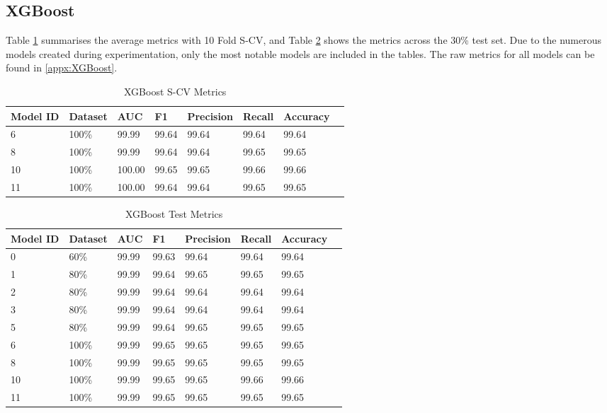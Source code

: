 \subsection{XGBoost}

 Table \ref{tab:xgb-scv-metrics} summarises the average metrics with 10 Fold S-CV, and Table \ref{tab:xgb-test-metrics} shows the metrics across the 30\% test set. Due to the numerous models created during experimentation, only the most notable models are included in the tables. The raw metrics for all models can be found in \ref{appx:XGBoost}. 

\begin{table}[h]
\centering
\caption{XGBoost S-CV Metrics}
\label{tab:xgb-scv-metrics}
\begin{tabular}{|l|l|l|l|l|l|l|l|}
\hline
\textbf{Model ID} & \textbf{Dataset} & \textbf{AUC} & \textbf{F1} & \textbf{Precision} & \textbf{Recall} & \textbf{Accuracy}  \\ \hline
6 & 100\% & 99.99 & 99.64 & 99.64 & 99.64 & 99.64 \\ \hline
8 & 100\% & 99.99 & 99.64 & 99.64 & 99.65 & 99.65 \\ \hline
10 & 100\% & 100.00 & 99.65 & 99.65 & 99.66 & 99.66 \\ \hline
11 & 100\% & 100.00 & 99.64 & 99.64 & 99.65 & 99.65 \\ \hline
\end{tabular}
\end{table}

\begin{table}[H]
\centering
\caption{XGBoost Test Metrics}
\label{tab:xgb-test-metrics}
\begin{tabular}{|l|l|l|l|l|l|l|l|}
\hline
\textbf{Model ID} & \textbf{Dataset} & \textbf{AUC} & \textbf{F1} & \textbf{Precision} & \textbf{Recall} & \textbf{Accuracy}  \\ \hline
0 & 60\% & 99.99 & 99.63 & 99.64 & 99.64 & 99.64 \\ \hline
1 & 80\% & 99.99 & 99.64 & 99.65 & 99.65 & 99.65 \\ \hline
2 & 80\% & 99.99 & 99.64 & 99.64 & 99.64 & 99.64 \\ \hline
3 & 80\% & 99.99 & 99.64 & 99.64 & 99.64 & 99.64 \\ \hline
5 & 80\% & 99.99 & 99.64 & 99.65 & 99.65 & 99.65 \\ \hline
6 & 100\% & 99.99 & 99.65 & 99.65 & 99.65 & 99.65 \\ \hline
8 & 100\% & 99.99 & 99.65 & 99.65 & 99.65 & 99.65 \\ \hline
10 & 100\% & 99.99 & 99.65 & 99.65 & 99.66 & 99.66 \\ \hline
11 & 100\% & 99.99 & 99.65 & 99.65 & 99.65 & 99.65 \\ \hline
\end{tabular}
\end{table}

